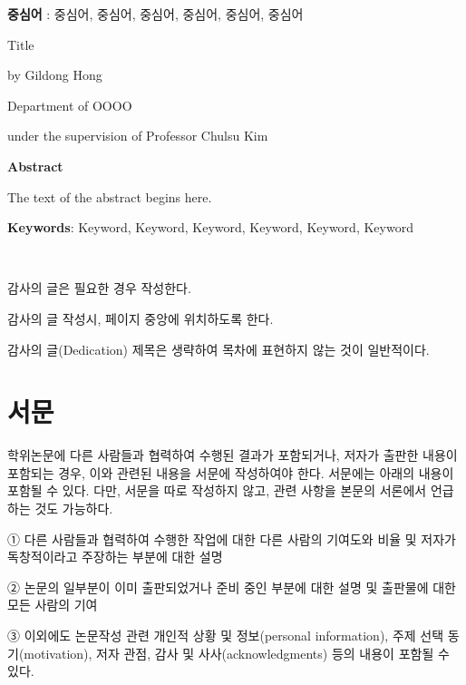 \documentclass[11pt]{report}
\begin{document}
\textbf{중심어} : 중심어, 중심어, 중심어, 중심어, 중심어, 중심어


\newpage
\begin{center}
\LARGE Title
\par\vspace{20pt}
\doublespacing
\normalsize by Gildong Hong\par
Department of OOOO\par
under the supervision of Professor Chulsu Kim

\par\vspace{20pt}
\LARGE \textbf{Abstract}
\end{center}

\justifying %
\doublespacing
\normalsize
The text of the abstract begins here. 
\par\vspace{1cm}

\textbf{Keywords}: Keyword, Keyword, Keyword, Keyword, Keyword, Keyword


\newpage
~
\vspace{5.5cm} \par
\begin{center}
감사의 글은 필요한 경우 작성한다.\par
감사의 글 작성시, 페이지 중앙에 위치하도록 한다.\par
감사의 글(Dedication) 제목은 생략하여 목차에 표현하지 않는 것이 일반적이다.
\end{center}


\newpage
{}
\chapter*{서문}

\normalsize
학위논문에 다른 사람들과 협력하여 수행된 결과가 포함되거나, 저자가 출판한 내용이 포함되는 경우, 이와 관련된 내용을 서문에 작성하여야 한다. 서문에는 아래의 내용이 포함될 수 있다. 다만, 서문을 따로 작성하지 않고, 관련 사항을 본문의 서론에서 언급하는 것도 가능하다. \par

① 다른 사람들과 협력하여 수행한 작업에 대한 다른 사람의 기여도와 비율 및 저자가 독창적이라고 주장하는 부분에 대한 설명\par
② 논문의 일부분이 이미 출판되었거나 준비 중인 부분에 대한 설명 및 출판물에 대한 모든 사람의 기여\par
③ 이외에도 논문작성 관련 개인적 상황 및 정보(personal information), 주제 선택 동기(motivation), 저자 관점, 감사 및 사사(acknowledgments) 등의 내용이 포함될 수 있다.\par
\end{document}
